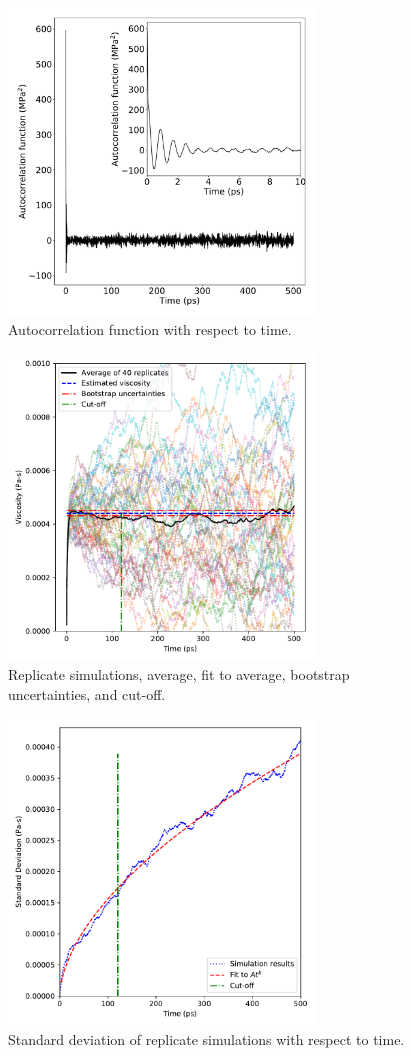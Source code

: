 \documentclass[preprint,review,11pt]{elsarticle}
\begin{document}
	\begin{figure}[htb!]
		\centering
		\includegraphics[width=3.2in]{autocorrelation_function.pdf}
		\caption{Autocorrelation function with respect to time.}
		\label{fig:autocorrelation}
	\end{figure} 

	\begin{figure}[htb!]
		\centering
		\includegraphics[width=3.2in]{GK_MCMC_all_rho0.pdf}
		\caption{Replicate simulations, average, fit to average, bootstrap uncertainties, and cut-off.}
		\label{fig:replicates}
	\end{figure} 

	\begin{figure}[htb!]
		\centering
		\includegraphics[width=3.2in]{sig_fit_rho0.pdf}
		\caption{Standard deviation of replicate simulations with respect to time.}
		\label{fig:standard_deviation}
	\end{figure} 
\end{document}
